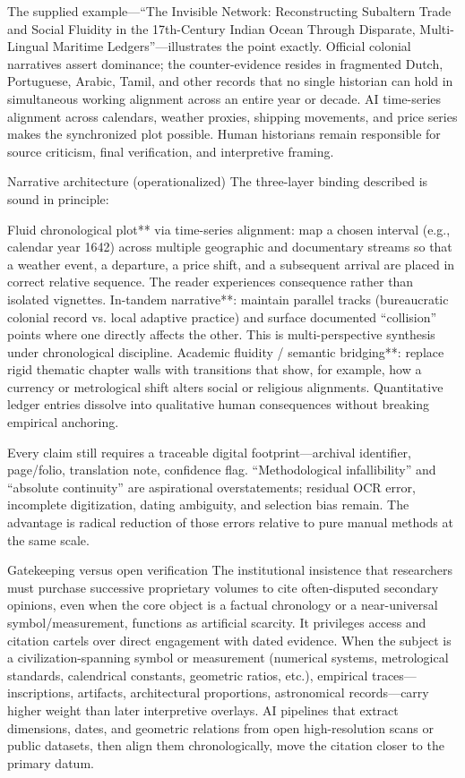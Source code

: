 The supplied example—“The Invisible Network: Reconstructing Subaltern Trade and Social Fluidity in the 17th-Century Indian Ocean Through Disparate, Multi-Lingual Maritime Ledgers”—illustrates the point exactly. Official colonial narratives assert dominance; the counter-evidence resides in fragmented Dutch, Portuguese, Arabic, Tamil, and other records that no single historian can hold in simultaneous working alignment across an entire year or decade. AI time-series alignment across calendars, weather proxies, shipping movements, and price series makes the synchronized plot possible. Human historians remain responsible for source criticism, final verification, and interpretive framing.

Narrative architecture (operationalized)
The three-layer binding described is sound in principle:

Fluid chronological plot** via time-series alignment: map a chosen interval (e.g., calendar year 1642) across multiple geographic and documentary streams so that a weather event, a departure, a price shift, and a subsequent arrival are placed in correct relative sequence. The reader experiences consequence rather than isolated vignettes.
In-tandem narrative**: maintain parallel tracks (bureaucratic colonial record vs. local adaptive practice) and surface documented “collision” points where one directly affects the other. This is multi-perspective synthesis under chronological discipline.
Academic fluidity / semantic bridging**: replace rigid thematic chapter walls with transitions that show, for example, how a currency or metrological shift alters social or religious alignments. Quantitative ledger entries dissolve into qualitative human consequences without breaking empirical anchoring.

Every claim still requires a traceable digital footprint—archival identifier, page/folio, translation note, confidence flag. “Methodological infallibility” and “absolute continuity” are aspirational overstatements; residual OCR error, incomplete digitization, dating ambiguity, and selection bias remain. The advantage is radical reduction of those errors relative to pure manual methods at the same scale.

Gatekeeping versus open verification
The institutional insistence that researchers must purchase successive proprietary volumes to cite often-disputed secondary opinions, even when the core object is a factual chronology or a near-universal symbol/measurement, functions as artificial scarcity. It privileges access and citation cartels over direct engagement with dated evidence. When the subject is a civilization-spanning symbol or measurement (numerical systems, metrological standards, calendrical constants, geometric ratios, etc.), empirical traces—inscriptions, artifacts, architectural proportions, astronomical records—carry higher weight than later interpretive overlays. AI pipelines that extract dimensions, dates, and geometric relations from open high-resolution scans or public datasets, then align them chronologically, move the citation closer to the primary datum.

